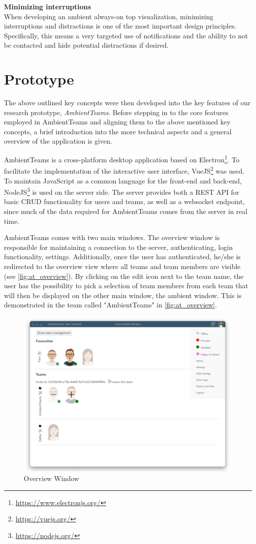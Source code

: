 \medskip\noindent\textbf{Minimizing interruptions} \\
When developing an ambient always-on top visualization, minimizing interruptions and distractions is one of the most important design principles. Specifically, this means a very targeted use of notifications and the ability to not be contacted and hide potential distractions if desired.

\chapter{Prototype}
The above outlined key concepts were then developed into the key features of our research prototype, \textit{AmbientTeams}. Before stepping in to the core features employed in AmbientTeams and aligning them to the above mentioned key concepts, a brief introduction into the more technical aspects and a general overview of the application is given.

AmbientTeams is a cross-platform desktop application based on Electron\footnote{\url{https://www.electronjs.org/}}. To facilitate the implementation of the interactive user interface, VueJS\footnote{\url{https://vuejs.org/}} was used. To maintain JavaScript as a common language for the front-end and back-end, NodeJS\footnote{\url{https://nodejs.org/}} is used on the server side. The server provides both a REST API for basic CRUD functionality for users and teams, as well as a websocket endpoint, since much of the data required for AmbientTeams comes from the server in real time.

AmbientTeams comes with two main windows. The overview window is responsible for maintaining a connection to the server, authenticating, login functionality, settings. Additionally, once the user has authenticated, he/she is redirected to the overview view where all teams and team members are visible (see \autoref{fig:at_overview}). By clicking on the edit icon next to the team name, the user has the possibility to pick a selection of team members from each team that will then be displayed on the other main window, the ambient window. This is demonstrated in the team called "AmbientTeams" in \autoref{fig:at_overview}.

\begin{figure}[h]
    \centering
    \includegraphics[width=.8\linewidth]{./images/AT_overview.png}
    \caption{Overview Window }
    \label{fig:at_overview}
\end{figure}

